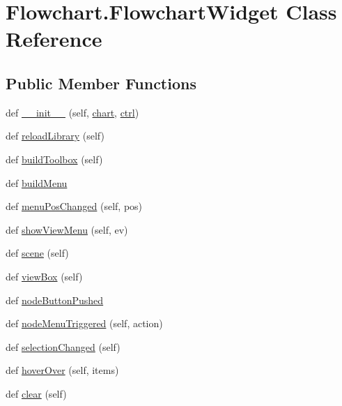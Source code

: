 \hypertarget{classFlowchart_1_1FlowchartWidget}{}\section{Flowchart.\+Flowchart\+Widget Class Reference}
\label{classFlowchart_1_1FlowchartWidget}
\subsection*{Public Member Functions}
\begin{DoxyCompactItemize}
\item 
def \hyperlink{classFlowchart_1_1FlowchartWidget_a02971e7ae11a9290a1ac25861f53fee7}{\+\_\+\+\_\+init\+\_\+\+\_\+} (self, \hyperlink{classFlowchart_1_1FlowchartWidget_a3eea10235556d1d25b05c4e5f37fa324}{chart}, \hyperlink{classFlowchart_1_1FlowchartWidget_adf3b7937106a3e532bd2d56ea9df365d}{ctrl})
\item 
def \hyperlink{classFlowchart_1_1FlowchartWidget_ae567b56ac4d9507f3744fcb286dd650e}{reload\+Library} (self)
\item 
def \hyperlink{classFlowchart_1_1FlowchartWidget_af9ba735553432421b4820551d3ff9a4d}{build\+Toolbox} (self)
\item 
def \hyperlink{classFlowchart_1_1FlowchartWidget_ad27da89f568cfc93b56b0910b9fb6d46}{build\+Menu}
\item 
def \hyperlink{classFlowchart_1_1FlowchartWidget_a0fc6e2229b29d5edbfa5a2491fd8cebe}{menu\+Pos\+Changed} (self, pos)
\item 
def \hyperlink{classFlowchart_1_1FlowchartWidget_ae910876c7de137de1a585259895719f7}{show\+View\+Menu} (self, ev)
\item 
def \hyperlink{classFlowchart_1_1FlowchartWidget_a0993bb00346a842ba98640bb4f466cdc}{scene} (self)
\item 
def \hyperlink{classFlowchart_1_1FlowchartWidget_ae77a962800938c1017e7fca2f59a837d}{view\+Box} (self)
\item 
def \hyperlink{classFlowchart_1_1FlowchartWidget_af0ade86349f44dc9da6c2991e0cf1857}{node\+Button\+Pushed}
\item 
def \hyperlink{classFlowchart_1_1FlowchartWidget_a344084793c3f5913e6d5f859d1358e93}{node\+Menu\+Triggered} (self, action)
\item 
def \hyperlink{classFlowchart_1_1FlowchartWidget_ac4871b18952de8ef13c0a4a450443976}{selection\+Changed} (self)
\item 
def \hyperlink{classFlowchart_1_1FlowchartWidget_a2a19ac749492773867c4829265962cbe}{hover\+Over} (self, items)
\item 
def \hyperlink{classFlowchart_1_1FlowchartWidget_a95bf7b9d2ad3ed5cbe5f104b79881a2c}{clear} (self)
\end{DoxyCompactItemize}
